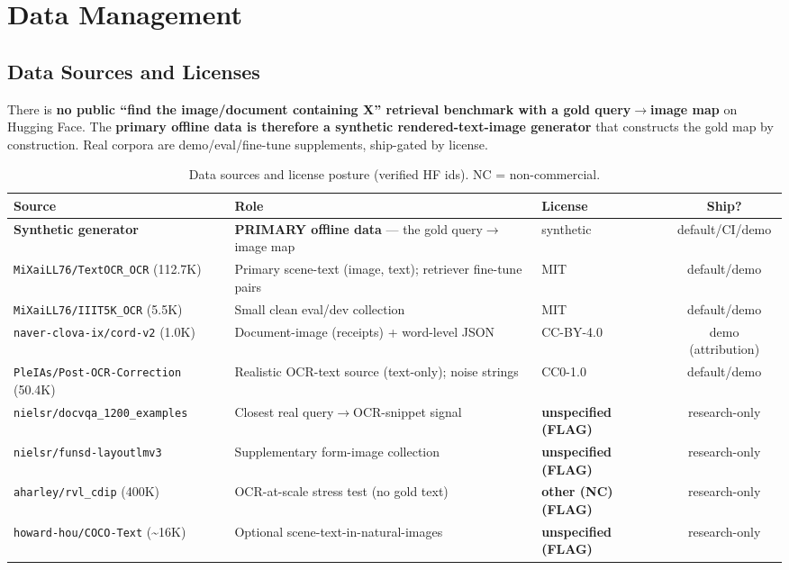 \documentclass[12pt,a4paper]{article}
\newcommand{\FLAGmark}{\textbf{(FLAG)}}
\begin{document}
\section{Data Management}

\subsection{Data Sources and Licenses}

There is \textbf{no public ``find the image/document containing X'' retrieval benchmark with a gold query$\rightarrow$image map} on Hugging Face. The \textbf{primary offline data is therefore a synthetic rendered-text-image generator} that constructs the gold map by construction. Real corpora are demo/eval/fine-tune supplements, ship-gated by license.

\begin{table}[H]
\centering
\caption{Data sources and license posture (verified HF ids). NC = non-commercial.}
\small
\begin{tabularx}{\linewidth}{@{} l L l c @{}}
\toprule
\textbf{Source} & \textbf{Role} & \textbf{License} & \textbf{Ship?} \\
\midrule
\textbf{Synthetic generator} & \textbf{PRIMARY offline data} --- the gold query$\rightarrow$image map & synthetic & default/CI/demo \\
\texttt{MiXaiLL76/TextOCR\_OCR} (112.7K) & Primary scene-text (image, text); retriever fine-tune pairs & MIT & default/demo \\
\texttt{MiXaiLL76/IIIT5K\_OCR} (5.5K) & Small clean eval/dev collection & MIT & default/demo \\
\texttt{naver-clova-ix/cord-v2} (1.0K) & Document-image (receipts) + word-level JSON & CC-BY-4.0 & demo (attribution) \\
\texttt{PleIAs/Post-OCR-Correction} (50.4K) & Realistic OCR-text source (text-only); noise strings & CC0-1.0 & default/demo \\
\midrule
\texttt{nielsr/docvqa\_1200\_examples} & Closest real query$\rightarrow$OCR-snippet signal & \textbf{unspecified} \FLAGmark & research-only \\
\texttt{nielsr/funsd-layoutlmv3} & Supplementary form-image collection & \textbf{unspecified} \FLAGmark & research-only \\
\texttt{aharley/rvl\_cdip} (400K) & OCR-at-scale stress test (no gold text) & \textbf{other (NC)} \FLAGmark & research-only \\
\texttt{howard-hou/COCO-Text} (\textasciitilde16K) & Optional scene-text-in-natural-images & \textbf{unspecified} \FLAGmark & research-only \\
\bottomrule
\end{tabularx}
\end{table}
\end{document}
